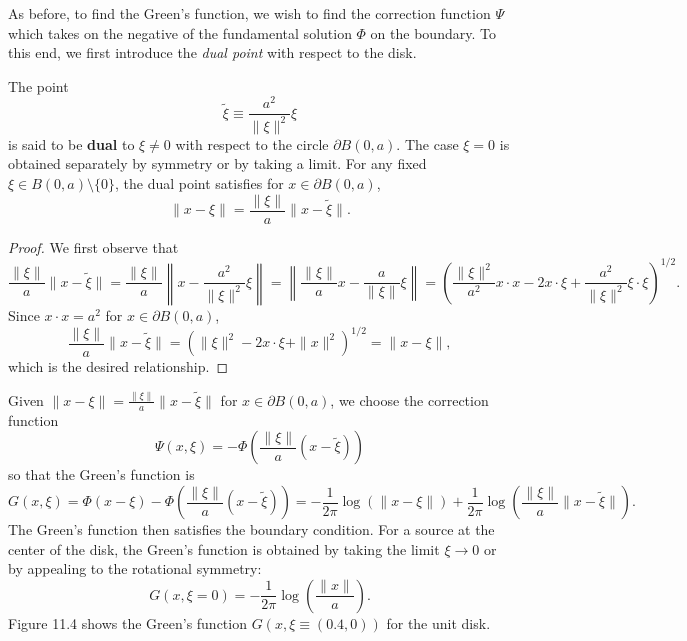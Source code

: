 As before, to find the Green's function, we wish to find the correction function $\Psi$ which takes on the negative of the fundamental solution $\Phi$ on the boundary. To this end, we first introduce the \textit{dual point} with respect to the disk.

\begin{definition}
    The point
    \[\tilde{\xi} \equiv \frac{a^2}{\|\xi\|^2}\xi\]
    is said to be \textbf{dual} to $\xi \neq 0$ with respect to the circle $\partial B(0, a)$. The case $\xi = 0$ is obtained separately by symmetry or by taking a limit. For any fixed $\xi \in B(0, a) \setminus \{0\}$, the dual point satisfies for $x \in \partial B(0, a)$,
    \[\|x - \xi\| = \frac{\|\xi\|}{a}\|x - \tilde{\xi}\|.\]
\end{definition}
\begin{proof}
    We first observe that
    \[\frac{\|\xi\|}{a}\|x - \tilde{\xi}\| = \frac{\|\xi\|}{a}\left\|x - \frac{a^2}{\|\xi\|^2}\xi\right\| = \left\|\frac{\|\xi\|}{a}x - \frac{a}{\|\xi\|}\xi\right\| = \left(\frac{\|\xi\|^2}{a^2}x \cdot x - 2x \cdot \xi + \frac{a^2}{\|\xi\|^2}\xi \cdot \xi\right)^{1/2}.\]
    Since $x \cdot x = a^2$ for $x \in \partial B(0, a)$,
    \[\frac{\|\xi\|}{a}\|x - \tilde{\xi}\| = \left(\|\xi\|^2 - 2x \cdot \xi + \|x\|^2\right)^{1/2} = \|x - \xi\|,\]
    which is the desired relationship.
\end{proof}

Given $\|x - \xi\| = \frac{\|\xi\|}{a}\|x - \tilde{\xi}\|$ for $x \in \partial B(0, a)$, we choose the correction function
\[\Psi(x, \xi) = -\Phi\left(\frac{\|\xi\|}{a}(x - \tilde{\xi})\right)\]
so that the Green's function is
\[G(x, \xi) = \Phi(x - \xi) - \Phi\left(\frac{\|\xi\|}{a}(x - \tilde{\xi})\right) = -\frac{1}{2\pi}\log(\|x - \xi\|) + \frac{1}{2\pi}\log\left(\frac{\|\xi\|}{a}\|x - \tilde{\xi}\|\right).\]
The Green's function then satisfies the boundary condition. For a source at the center of the disk, the Green's function is obtained by taking the limit $\xi \to 0$ or by appealing to the rotational symmetry:
\[G(x, \xi = 0) = -\frac{1}{2\pi}\log\left(\frac{\|x\|}{a}\right).\]
Figure 11.4 shows the Green's function $G(x, \xi \equiv (0.4, 0))$ for the unit disk.


